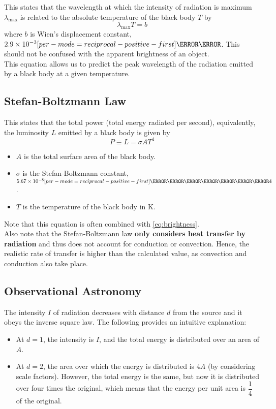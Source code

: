 \documentclass[a4paper,12pt]{article}
\let\oldsi\si
\renewcommand{\si}[1]{\oldsi[per-mode=reciprocal-positive-first]{#1}}
\newcommand{\lb}{\\[8pt]}
\begin{document}
This states that the wavelength at which the intensity of radiation is maximum $\lambda_{\max}$ is related to the absolute temperature of the black body $T$ by
$$\lambda_{\max}T = b$$
where $b$ is Wien's displacement constant, $2.9 \times 10^{-3} \si{\m\kelvin}$. This should not be confused with the apparent brightness of an object.\lb
This equation allows us to predict the peak wavelength of the radiation emitted by a black body at a given temperature.

\subsection{Stefan-Boltzmann Law}

This states that the total power (total energy radiated per second), equivalently, the luminosity $L$ emitted by a black body is given by
$$P \equiv L = \sigma A T^4$$
\begin{itemize}
  \item $A$ is the total surface area of the black body.
  \item $\sigma$ is the Stefan-Boltzmann constant, $5.67 \times 10^{-8} \si{\W\per\m\squared\per\kelvin\tothe{4}}$.
  \item $T$ is the temperature of the black body in K.
\end{itemize}

Note that this equation is often combined with \cref{eq:brightness}.\lb
Also note that the Stefan-Boltzmann law \textbf{only considers heat transfer by radiation} and thus does not account for conduction or convection. Hence, the realistic rate of transfer is higher than the calculated value, as convection and conduction also take place.

\pagebreak

\subsection{Observational Astronomy}

\begin{figure}[H]
  \centering
  
\end{figure}

The intensity $I$ of radiation decreases with distance $d$ from the source and it obeys the inverse square law. The following provides an intuitive explanation:
\begin{itemize}
  \item At $d = 1$, the intensity is $I$, and the total energy is distributed over an area of $A$.
  \item At $d = 2$, the area over which the energy is distributed is $4A$ (by considering scale factors). However, the total energy is the same, but now it is distributed over four times the original, which means that the energy per unit area is $\dfrac{1}{4}$ of the original.
\end{itemize}
\end{document}
